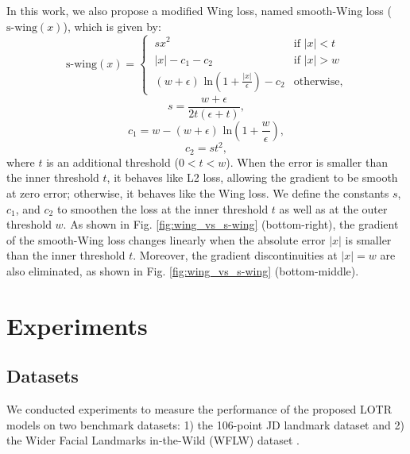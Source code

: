 \documentclass[journal]{IEEEtran}
\begin{document}
In this work, we also propose a modified Wing loss, named smooth-Wing loss ($\text{s-wing}(x)$), which is given by:
\begin{equation}
    \label{eq:smooth-wing}
    \text{s-wing}(x) =
    \begin{cases}
        \ s x^2     & \text{if } |x| < t \\
        \ |x| - c_1 - c_2   & \text{if } |x| > w \\
        \ (w + \epsilon) \text{ ln}(1 + \frac{|x|}{\epsilon}) - c_2     & \text{otherwise},
    \end{cases}
\end{equation}
\begin{equation}
    s = \frac{w + \epsilon}{2t(\epsilon + t)},
\end{equation}
\begin{equation}
    c_1 = w - (w + \epsilon) \text{ ln}(1 + \frac{w}{\epsilon}),
\end{equation}
\begin{equation}
    c_2 = s t^2,
\end{equation}
where $t$ is an additional threshold ($0 < t < w$).
When the error is smaller than the inner threshold $t$, it behaves like L2 loss, allowing the gradient to be smooth at zero error; otherwise, it behaves like the Wing loss. 
We define the constants $s$, $c_1$, and $c_2$ to smoothen the loss at the inner threshold $t$ as well as at the outer threshold $w$. 
As shown in Fig. \ref{fig:wing_vs_s-wing} (bottom-right), the gradient of the smooth-Wing loss changes linearly when the absolute error $|x|$ is smaller than the inner threshold $t$. 
Moreover, the gradient discontinuities at $|x| = w$ are also eliminated, as shown in Fig. \ref{fig:wing_vs_s-wing} (bottom-middle).



\section{Experiments}\label{sec:exp}



\subsection{Datasets}\label{subsec:datasets}

We conducted experiments to measure the performance of the proposed LOTR models on two benchmark datasets: 1) the 106-point JD landmark dataset \cite{liu2019} and 2) the Wider Facial Landmarks in-the-Wild (WFLW) dataset \cite{Wu2018}.
\end{document}
